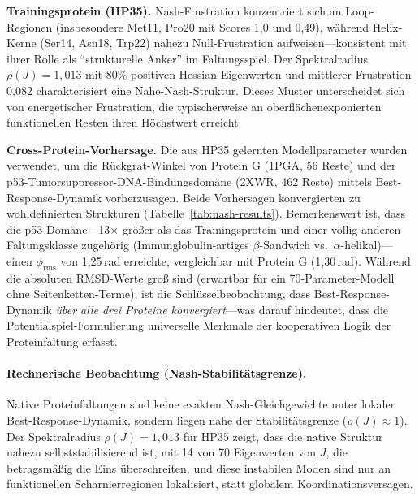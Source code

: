 \documentclass[12pt,a4paper]{article}
\theoremstyle{remark}
\begin{document}
\textbf{Trainingsprotein (HP35).} Nash-Frustration konzentriert sich an Loop-Regionen (insbesondere Met11, Pro20 mit Scores 1{,}0 und 0{,}49), w\"ahrend Helix-Kerne (Ser14, Asn18, Trp22) nahezu Null-Frustration aufweisen---konsistent mit ihrer Rolle als ``strukturelle Anker'' im Faltungsspiel. Der Spektralradius $\rho(J) = 1{,}013$ mit 80\% positiven Hessian-Eigenwerten und mittlerer Frustration 0{,}082 charakterisiert eine Nahe-Nash-Struktur. Dieses Muster unterscheidet sich von energetischer Frustration, die typischerweise an oberfl\"achenexponierten funktionellen Resten ihren H\"ochstwert erreicht.

\textbf{Cross-Protein-Vorhersage.} Die aus HP35 gelernten Modellparameter wurden verwendet, um die R\"uckgrat-Winkel von Protein G (1PGA, 56 Reste) und der p53-Tumorsuppressor-DNA-Bindungsdom\"ane (2XWR, 462 Reste) mittels Best-Response-Dynamik vorherzusagen. Beide Vorhersagen konvergierten zu wohldefinierten Strukturen (Tabelle~\ref{tab:nash-results}). Bemerkenswert ist, dass die p53-Dom\"ane---13$\times$ gr\"o\ss{}er als das Trainingsprotein und einer v\"ollig anderen Faltungsklasse zugeh\"orig (Immunglobulin-artiges $\beta$-Sandwich vs.\ $\alpha$-helikal)---einen $\phi_{\text{rms}}$ von 1{,}25\,rad erreichte, vergleichbar mit Protein G (1{,}30\,rad). W\"ahrend die absoluten RMSD-Werte gro\ss{} sind (erwartbar f\"ur ein 70-Parameter-Modell ohne Seitenketten-Terme), ist die Schl\"usselbeobachtung, dass Best-Response-Dynamik \emph{\"uber alle drei Proteine konvergiert}---was darauf hindeutet, dass die Potentialspiel-Formulierung universelle Merkmale der kooperativen Logik der Proteinfaltung erfasst.

\paragraph{Rechnerische Beobachtung (Nash-Stabilit\"atsgrenze).}
Native Proteinfaltungen sind keine exakten Nash-Gleichgewichte unter lokaler Best-Response-Dynamik, sondern liegen nahe der Stabilit\"atsgrenze ($\rho(J) \approx 1$). Der Spektralradius $\rho(J) = 1{,}013$ f\"ur HP35 zeigt, dass die native Struktur nahezu selbststabilisierend ist, mit 14 von 70 Eigenwerten von $J$, die betragsm\"a\ss{}ig die Eins \"uberschreiten, und diese instabilen Moden sind nur an funktionellen Scharnierregionen lokalisiert, statt globalem Koordinationsversagen.
\end{document}
